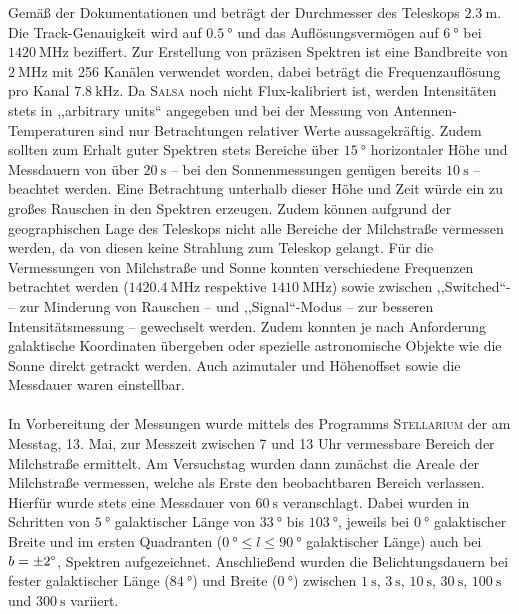Gemäß der Dokumentationen \cite{Usermanual} und \cite{AntennaResp} beträgt der Durchmesser des Teleskops $\SI{2.3}{\metre}$. Die Track-Genauigkeit wird auf $\SI{0.5}{\degree}$ und das Auflösungsvermögen auf $\SI{6}{\degree}$ bei $\SI{1420}{\mega \hertz}$ beziffert.
Zur Erstellung von präzisen Spektren ist eine Bandbreite von $\SI{2}{\mega \hertz}$ mit 256 Kanälen verwendet worden, dabei beträgt die Frequenzauflösung pro Kanal $\SI{7.8}{\kilo \hertz}$.
Da \textsc{Salsa} noch nicht Flux-kalibriert ist, werden Intensitäten stets in ,,arbitrary units`` angegeben und bei der Messung von Antennen-Temperaturen sind nur Betrachtungen relativer Werte aussagekräftig.
Zudem sollten zum Erhalt guter Spektren stets Bereiche über $\SI{15}{\degree}$ horizontaler Höhe und Messdauern von über $\SI{20}{\second}$ -- bei den Sonnenmessungen genügen bereits $\SI{10}{\second}$ -- beachtet werden. Eine Betrachtung unterhalb dieser Höhe und Zeit würde ein zu großes Rauschen in den Spektren erzeugen. Zudem können aufgrund der geographischen Lage des Teleskops nicht alle Bereiche der Milchstraße vermessen werden, da von diesen keine Strahlung zum Teleskop gelangt.
Für die Vermessungen von Milchstraße und Sonne konnten verschiedene Frequenzen betrachtet werden ($\SI{1420.4}{\mega \hertz}$ respektive $\SI{1410}{\mega \hertz}$) sowie zwischen  ,,Switched``- -- zur Minderung von Rauschen --  und ,,Signal``-Modus -- zur besseren Intensitätsmessung -- gewechselt werden.
Zudem konnten je nach Anforderung galaktische Koordinaten übergeben oder spezielle astronomische Objekte wie die Sonne direkt getrackt werden.
Auch azimutaler und Höhenoffset sowie die Messdauer waren einstellbar.\\ 
\\
In Vorbereitung der Messungen wurde mittels des Programms \textsc{Stellarium} der am Messtag, 13. Mai, zur Messzeit zwischen 7 und 13 Uhr vermessbare Bereich der Milchstraße ermittelt.
Am Versuchstag wurden dann zunächst die Areale der Milchstraße vermessen, welche als Erste den beobachtbaren Bereich verlassen.
Hierfür wurde stets eine Messdauer von $\SI{60}{\second}$ veranschlagt.
Dabei wurden in Schritten von $\SI{5}{\degree}$ galaktischer Länge von $\SI{33}{\degree}$ bis $\SI{103}{\degree}$, jeweils bei $\SI{0}{\degree}$ galaktischer Breite und im ersten Quadranten ($\SI{0}{\degree} \le l \le \SI{90}{\degree}$ galaktischer Länge) auch bei $b=\pm \si{2}{\degree}$, Spektren aufgezeichnet.
Anschließend wurden die Belichtungsdauern bei fester galaktischer Länge ($\SI{84}{\degree}$) und Breite ($\SI{0}{\degree}$) zwischen $\SI{1}{\second}$, $\SI{3}{\second}$, $\SI{10}{\second}$, $\SI{30}{\second}$, $\SI{100}{\second}$ und $\SI{300}{\second}$ variiert.
